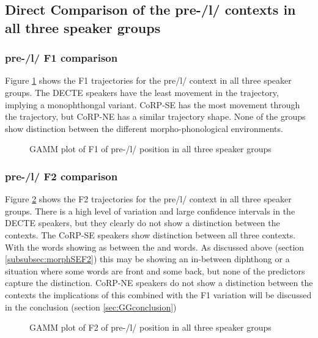\documentclass[../../../00.FullDoc/tex/Thesis]{subfiles}
\begin{document}
\subsection{Direct Comparison of the pre-/l/ contexts in all three speaker groups} \label{subsec:GOALcomparison}
\subsubsection{pre-/l/ F1 comparison}
Figure \ref{fig:goalF1} shows the F1 trajectories for the pre/l/ context in all three speaker groups. The DECTE speakers have the least movement in the trajectory, implying a monophthongal variant. CoRP-SE has the most movement through the trajectory, but CoRP-NE has a similar trajectory shape. None of the groups show distinction between the different morpho-phonological environments.

\begin{landscape}
	\vspace*{\fill}
	\begin{center}
		\begin{figure}[H]
			
			\caption{GAMM plot of F1 of pre-/l/ position in all three speaker groups} \label{fig:goalF1}
		\end{figure}
	\end{center}
	\vspace*{\fill}
\end{landscape}

\subsubsection{pre-/l/ F2 comparison}
Figure \ref{fig:goalF2} shows the F2 trajectories for the pre/l/ context in all three speaker groups. There is a high level of variation and large confidence intervals in the DECTE speakers, but they clearly do not show a distinction between the contexts. The CoRP-SE speakers show distinction between all three contexts. With the \holey{} words showing as between the \hole{} and \holy{} words. As discussed above (section \ref{subsubsec:morphSEF2}) this may be showing an in-between diphthong or a situation where some words are front and some back, but none of the predictors capture the distinction. CoRP-NE speakers do not show a distinction between the contexts the implications of this combined with the F1 variation will be discussed in the conclusion (section \ref{sec:GGconclusion})

\begin{landscape}
	\vspace*{\fill}
	\begin{center}
		\begin{figure}[H]
			
			\caption{GAMM plot of F2 of pre-/l/ position in all three speaker groups} \label{fig:goalF2}
		\end{figure}
	\end{center}
	\vspace*{\fill}
\end{landscape}
\end{document}
